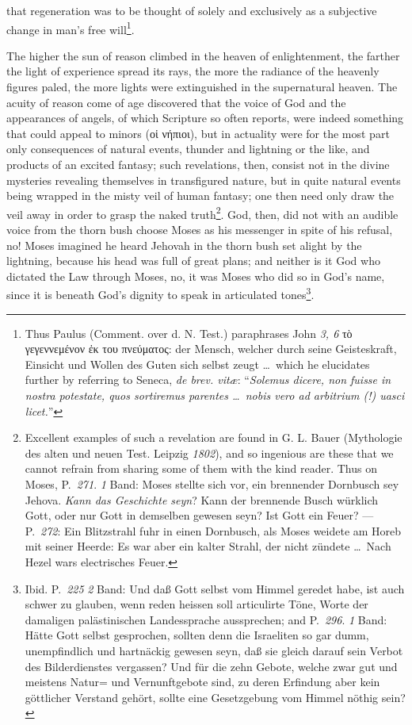 \documentclass[12pt]{book}
\newcommand{\opage}[1]{\marginnote{\footnotesize\textit{[#1]}}}
\begin{document}
that regeneration was to be thought of solely and exclusively as a subjective
change in man's free will\footnote{Thus Paulus (Comment. over d. N. Test.)
paraphrases John \textit{3, 6} τὸ γεγεννεμένον ἐκ του πνεύματος: der Mensch,
welcher durch seine Geisteskraft, Einsicht und Wollen des Guten sich selbst
zeugt \ldots\ which he elucidates further by referring to Seneca, \textit{de
brev. vitæ}: ``\textit{Solemus dicere, non fuisse in nostra potestate, quos
sortiremus parentes \ldots\ nobis vero ad arbitrium (!) uasci licet.}''}.

The higher the sun of reason climbed in the heaven of enlightenment, the farther
the light of experience spread its rays, the more the radiance of the heavenly
figures paled, the more lights
\opage{93} %
\setcounter{footnote}{0}%
were extinguished in the supernatural heaven. The acuity of reason come of age
discovered that the voice of God and the appearances of angels, of which
Scripture so often reports, were indeed something that could appeal to minors
(οἱ νήπιοι), but in actuality were for the most part only consequences of
natural events, thunder and lightning or the like, and products of an excited
fantasy; such revelations, then, consist not in the divine mysteries revealing
themselves in transfigured nature, but in quite natural events being wrapped in
the misty veil of human fantasy; one then need only draw the veil away in order
to grasp the naked truth\footnote{Excellent examples of such a revelation are
found in G. L. Bauer (Mythologie des alten und neuen Test. Leipzig
\textit{1802}), and so ingenious are these that we cannot refrain from sharing
some of them with the kind reader. Thus on Moses, P.~\textit{271}. \textit{1}
Band: Moses stellte sich vor, ein brennender Dornbusch sey Jehova. \emph{Kann
das Geschichte seyn}? Kann der brennende Busch würklich Gott, oder nur Gott in
demselben gewesen seyn? Ist Gott ein Feuer? --- P.~\textit{272}: Ein
Blitzstrahl fuhr in einen Dornbusch, als Moses weidete am Horeb mit seiner
Heerde: Es war aber ein kalter Strahl, der nicht zündete \ldots\ Nach Hezel
wars electrisches Feuer.}. God, then, did not with an audible voice from the
thorn bush choose Moses as his messenger in spite of his refusal, no! Moses
imagined he heard Jehovah in the thorn bush set alight by the lightning,
because his head was full of great plans; and neither is it God who dictated
the Law through Moses, no, it was Moses who did so in God's name, since it is
beneath God's dignity to speak in articulated tones\footnote{Ibid.
P.~\textit{225} \textit{2} Band: Und daß Gott selbst vom Himmel geredet habe,
ist auch schwer zu glauben, wenn reden heissen soll articulirte Töne, Worte der
damaligen palästinischen Landessprache aussprechen; and P.~\textit{296}.
\textit{1} Band: Hätte Gott selbst gesprochen, sollten denn die Israeliten so
gar dumm, unempfindlich und hartnäckig gewesen seyn, daß sie gleich darauf sein
Verbot des Bilderdienstes vergassen? Und für die zehn Gebote, welche zwar gut
und meistens Natur= und Vernunftgebote sind, zu deren Erfindung aber kein
göttlicher Verstand gehört, sollte eine Gesetzgebung vom Himmel nöthig sein?}.
\end{document}
